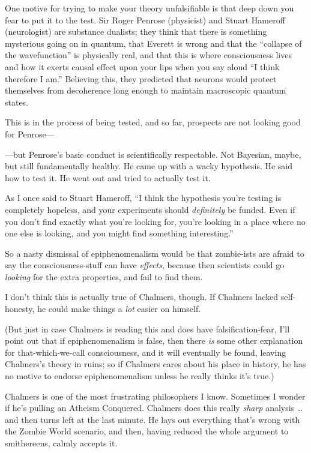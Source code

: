{
 One motive for trying to make your theory unfalsifiable is that
deep down you fear to put it to the test. Sir Roger Penrose (physicist)
and Stuart Hameroff (neurologist) are substance dualists; they think
that there is something mysterious going on in quantum, that Everett is
wrong and that the ``collapse of the
wavefunction'' is physically real, and that this is
where consciousness lives and how it exerts causal effect upon your
lips when you say aloud ``I think therefore I
am.'' Believing this, they predicted that neurons
would protect themselves from decoherence long enough to maintain
macroscopic quantum states.}

{
 This is in the process of being tested, and so far, prospects are
not looking good for Penrose---}

{
 {}---but Penrose's basic conduct is scientifically
respectable. Not Bayesian, maybe, but still fundamentally healthy. He
came up with a wacky hypothesis. He said how to test it. He went out
and tried to actually test it.}

{
 As I once said to Stuart Hameroff, ``I think the
hypothesis you're testing is completely hopeless, and
your experiments should \textit{definitely} be funded. Even if you
don't find exactly what you're looking
for, you're looking in a place where no one else is
looking, and you might find something interesting.''}

{
 So a nasty dismissal of epiphenomenalism would be that zombie-ists
are afraid to say the consciousness-stuff can have \textit{effects},
because then scientists could go \textit{looking} for the extra
properties, and fail to find them.}

{
 I don't think this is actually true of Chalmers,
though. If Chalmers lacked self-honesty, he could make things a
\textit{lot} easier on himself.}

{
 (But just in case Chalmers is reading this and does have
falsification-fear, I'll point out that if
epiphenomenalism is false, then there \textit{is} some other
explanation for that-which-we-call consciousness, and it will
eventually be found, leaving Chalmers's theory in
ruins; so if Chalmers cares about his place in history, he has no
motive to endorse epiphenomenalism unless he really thinks
it's true.)}

{
 Chalmers is one of the most frustrating philosophers I know.
Sometimes I wonder if he's pulling an Atheism
Conquered. Chalmers does this really \textit{sharp} analysis \ldots and
then turns left at the last minute. He lays out everything
that's wrong with the Zombie World scenario, and then,
having reduced the whole argument to smithereens, calmly accepts it.}

